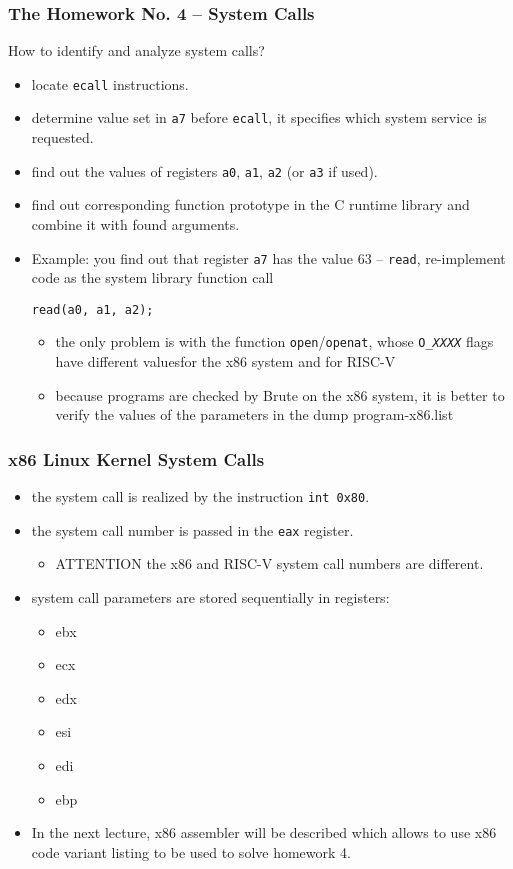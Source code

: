 \documentclass{beamer}
\begin{document}
\begin{frame}[fragile]
\frametitle{The Homework No. 4 -- System Calls}

How to identify and analyze system calls?
\begin{itemize}
\item locate \texttt{ecall} instructions.
\item determine value set in \texttt{a7} before \texttt{ecall}, it specifies which system service is requested.
\item find out the values ​​of registers \texttt{a0}, \texttt{a1}, \texttt{a2} (or \texttt{a3} if used).
\item find out corresponding function prototype in the C runtime library and combine it with found arguments.
\item Example: you find out that register \texttt{a7} has the value 63 -- \texttt{read}, re-implement code as the system library function call
\begin{verbatim}
read(a0, a1, a2);
\end{verbatim}
\begin{itemize}
\item the only problem is with the function \texttt{open}/\texttt{openat}, whose \texttt{O\_\textit{XXXX}} flags have different values ​​for the x86 system and for RISC-V
\item because programs are checked by Brute on the x86 system, it is better to verify the values ​​of the parameters in the dump program-x86.list
 \end{itemize}
\end{itemize}
\end{frame}

\begin{frame}
\frametitle{x86 Linux Kernel System Calls}

\begin{itemize}
\item the system call is realized by the instruction \texttt{int 0x80}.
\item the system call number is passed in the \texttt{eax} register.
\begin{itemize}
\item ATTENTION the x86 and RISC-V system call numbers are different.
\end{itemize}
\item system call parameters are stored sequentially in registers:
\begin{itemize}
\item ebx
\item ecx
\item edx
\item esi
\item edi
\item ebp
\end{itemize}
\item In the next lecture, x86 assembler will be described which allows to use x86 code variant listing to be used to solve homework 4.
\end{itemize}
\end{frame}
\end{document}
